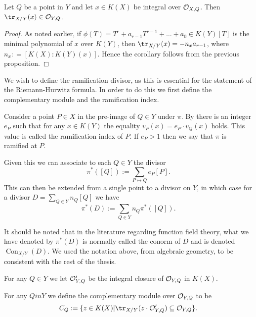     \begin{cor}\label{traceinclosure}
    Let $Q$ be a point in $Y$ and let $x\in K(X)$ be integral over ${\cal O}_{X,Q}$.
    Then $\tr_{X/Y}(x)\in \cO_{Y,Q}$.
    \end{cor}
    \begin{proof}
    As noted earlier, if $\phi(T)=T^r+a_{r-1}T^{r-1} + \ldots + a_0\in K(Y)[T]$ is the minimal polynomial of $x$ over $K(Y)$, then $\tr_{X/Y}(x)=-n_xa_{r-1}$, where $n_x : = [K(X):K(Y)(x)]$.
    Hence the corollary follows from the previous proposition.
    \end{proof}


We wish to define the ramification divisor, as this is essential for the statement of the Riemann-Hurwitz formula.
In order to do this we first define the complementary module and the ramification index.


    \begin{defn}
    Consider a point $P\in X$ in the pre-image of $Q\in Y$ under $\pi$.
    By \cite[Prop. 3.1.4]{stichtenoth} there is an integer $e_P$ such that for any $x\in K(Y)$ the equality $v_P(x) = e_P\cdot v_Q(x)$ holds.
    This value is called the ramification index of $P$.
    If $e_P>1$ then we say that $\pi$ is ramified at $P$.
    \end{defn}

Given this we can associate to each $Q\in Y$ the divisor
    \[
    \pi^*([Q]) := \sum_{P\mapsto Q} e_P [P].
    \]
This can then be extended from a single point to a divisor on $Y$, in which case for a divisor $D = \sum_{Q\in Y}n_Q [Q]$ we have
    \[
    \pi^*(D) := \sum_{Q\in Y}n_Q \pi^*([Q]).
    \]

    \begin{rem}
    It should be noted that in the literature regarding function field theory, what we have denoted by $\pi^*(D)$ is normally called the conorm of $D$ and is denoted $\operatorname{Con}_{X/Y}(D)$. 
    We used the notation above, from algebraic geometry, to be consistent with the rest of the thesis.
    \end{rem}

    For any $Q\in Y$ we let ${\cal O}_{Y,Q}'$ be the integral closure of ${\cal O}_{Y,Q}$ in $K(X)$.

    \begin{defn}
    For any $Q in Y$ we define the complementary module over ${\cal O}_{Y,Q}$ to be
        \[
        C_Q :=\{z\in K(X) | \tr_{X/Y}(z\cdot \cO_{Y,Q}') \subseteq \cO_{Y,Q}\}.
        \]
    \end{defn}


